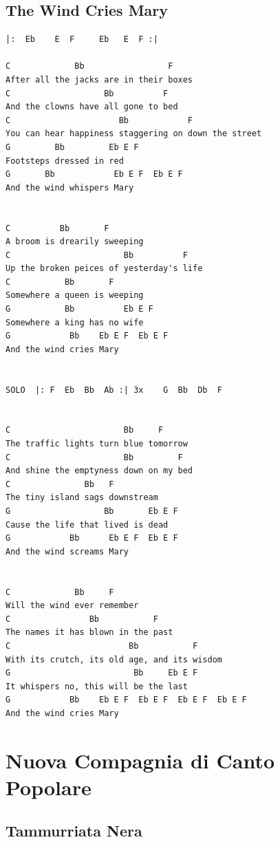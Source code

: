 \documentclass[a4paper]{article}
\begin{document}
\subsection{The Wind Cries Mary} %
\label{sub:The Wind Cries Mary}
\begin{Verbatim}[commandchars=\\\{\}]
 |:  Eb    E  F     Eb   E  F :| 
 
C             Bb                 F 
After all the jacks are in their boxes 
C                   Bb          F 
And the clowns have all gone to bed 
C                      Bb            F 
You can hear happiness staggering on down the street 
G         Bb         Eb E F 
Footsteps dressed in red 
G       Bb            Eb E F  Eb E F 
And the wind whispers Mary 
 
 
C          Bb       F 
A broom is drearily sweeping 
C                       Bb          F 
Up the broken peices of yesterday's life 
C           Bb       F 
Somewhere a queen is weeping 
G           Bb          Eb E F 
Somewhere a king has no wife 
G            Bb    Eb E F  Eb E F 
And the wind cries Mary 
 
 
SOLO  |: F  Eb  Bb  Ab :| 3x    G  Bb  Db  F 
 
 
C                       Bb     F 
The traffic lights turn blue tomorrow 
C                       Bb         F 
And shine the emptyness down on my bed 
C               Bb   F 
The tiny island sags downstream 
G                   Bb       Eb E F 
Cause the life that lived is dead 
G            Bb      Eb E F  Eb E F 
And the wind screams Mary 
 
 
C             Bb     F 
Will the wind ever remember 
C                Bb           F 
The names it has blown in the past 
C                        Bb           F 
With its crutch, its old age, and its wisdom 
G                         Bb     Eb E F 
It whispers no, this will be the last 
G            Bb    Eb E F  Eb E F  Eb E F  Eb E F 
And the wind cries Mary 
\end{Verbatim}
\newpage
\section{Nuova Compagnia di Canto Popolare} %
\label{sec:Nuova Compagnia di Canto Popolare}
\subsection{Tammurriata Nera} %
\label{sub:Tammurriata Nera}
\end{document}
